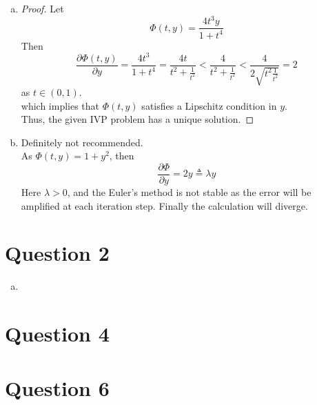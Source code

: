 \documentclass[paper=a4, fontsize=11pt]{scrartcl} %
\numberwithin{equation}{section} %
\numberwithin{figure}{section} %
\numberwithin{table}{section} %
\begin{document}
\begin{enumerate}[(a)]
		\item
			\begin{proof}
				Let
				\begin{equation}
					\Phi(t, y) = \frac{4t^3y}{1+t^4}
				\end{equation}
				Then
				\begin{equation}
					\frac{\partial \Phi(t, y)}{\partial y} = \frac{4t^3}{1+t^4} =\frac{4 t}{t^2 + \frac{1}{t^2}} < \frac{4}{t^2 + \frac{1}{t^2}} < \frac{4}{2 \sqrt{t^2 \frac{1}{t^2}}} = 2
				\end{equation}
				as $t\in (0,1)$.\\ 
				which implies that $\Phi(t, y)$ satisfies a Lipschitz condition in $y$.\\
				Thus, the given IVP problem has a unique solution.
			\end{proof} 
		
		\item 
			Definitely not recommended.\\
			As $\Phi(t, y) = 1 + y^2$, then
			\begin{equation}
				\frac{\partial \Phi}{\partial y} = 2 y \triangleq \lambda y
			\end{equation}
			Here $\lambda > 0$, and the Euler's method is not stable as the error will be amplified at each iteration step. Finally the calculation will diverge.
	\end{enumerate}

\section{Question 2}
	\begin{enumerate}[(a)]
		\item 
		
	\end{enumerate}

\section{Question 4}

\section{Question 6}
\end{document}
